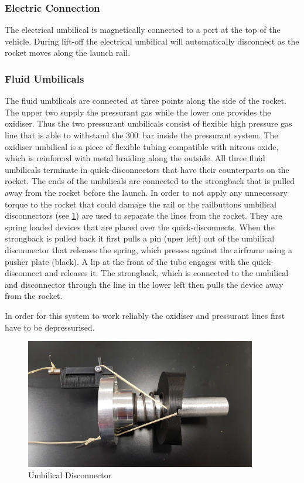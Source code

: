 \subsubsection{Electric Connection}
The electrical umbilical is magnetically connected to a port at the top of the vehicle. During lift-off the electrical umbilical will automatically disconnect as the rocket moves along the launch rail.

\subsubsection{Fluid Umbilicals}
The fluid umbilicals are connected at three points along the side of the rocket. The upper two supply the pressurant gas while the lower one provides the oxidiser. Thus the two pressurant umbilicals consist of flexible high pressure gas line that is able to withstand the \SI{300}{\bar} inside the pressurant system. The oxidiser umbilical is a piece of flexible tubing compatible with nitrous oxide, which is reinforced with metal braiding along the outside. All three fluid umbilicals terminate in quick-disconnectors that have their counterparts on the rocket. The ends of the umbilicals are connected to the strongback that is pulled away from the rocket before the launch. In order to not apply any unnecessary torque to the rocket that could damage the rail or the railbuttons umbilical disconnectors (see \cref{fig:umbilical_disc}) are used to separate the lines from the rocket.
They are spring loaded devices that are placed over the quick-disconnects. When the strongback is pulled back it first pulls a pin (uper left) out of the umbilical disconnector that releases the spring, which presses against the airframe using a pusher plate (black). A lip at the front of the tube engages with the quick-disconnect and releases it. The strongback, which is connected to the umbilical and disconnector through the line in the lower left then pulls the device away from the rocket.

In order for this system to work reliably the oxidiser and pressurant lines first have to be depressurised.

\begin{figure}
    \centering
    \includegraphics[width=0.9\textwidth]{GroundSystems/Umbilical_Disconnect.jpg}
    \caption{Umbilical Disconnector}
    \label{fig:umbilical_disc}
\end{figure}

